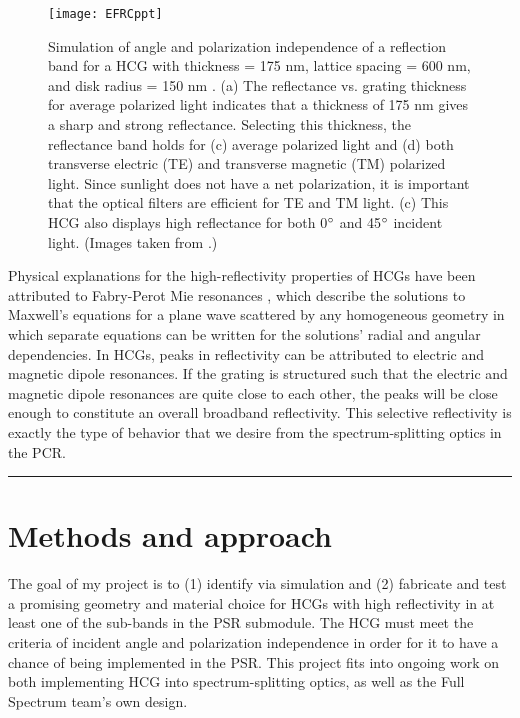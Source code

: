 \documentclass{article}
\begin{document}
\begin{figure}[h]
	\centering
	\texttt{[image: EFRCppt]}
	\caption{Simulation of angle and polarization independence of a reflection band for a HCG with thickness = 175 nm, lattice spacing = 600 nm, and disk radius = 150 nm \cite{Darbe}. (a) The reflectance vs. grating thickness for average polarized light indicates that a thickness of 175 nm gives a sharp and strong reflectance. Selecting this thickness, the reflectance band holds for (c) average polarized light and (d) both transverse electric (TE) and transverse magnetic (TM) polarized light. Since sunlight does not have a net polarization, it is important that the optical filters are efficient for TE and TM light. (c) This HCG also displays high reflectance for both 0$\degree$ and 45$\degree$ incident light. (Images taken from \cite{Darbe}.)}
	\label{EFRCppt}
\end{figure}

Physical explanations for the high-reflectivity properties of HCGs have been attributed to Fabry-Perot Mie resonances \cite{Karagodsky}, which describe the solutions to Maxwell's equations for a plane wave scattered by any homogeneous geometry in which separate equations can be written for the solutions' radial and angular dependencies. In HCGs, peaks in reflectivity can be attributed to electric and magnetic dipole resonances. If the grating is structured such that the electric and magnetic dipole resonances are quite close to each other, the peaks will be close enough to constitute an overall broadband reflectivity. This selective reflectivity is exactly the type of behavior that we desire from the spectrum-splitting optics in the PCR.
\pagebreak

\rule{450pt}{1pt}
\section*{Methods and approach}
The goal of my project is to (1) identify via simulation and (2) fabricate and test a promising geometry and material choice for HCGs with high reflectivity in at least one of the sub-bands in the PSR submodule. The HCG must meet the criteria of incident angle and polarization independence in order for it to have a chance of being implemented in the PSR. This project fits into ongoing work on both implementing HCG into spectrum-splitting optics, as well as the Full Spectrum team's own design. 
\end{document}
